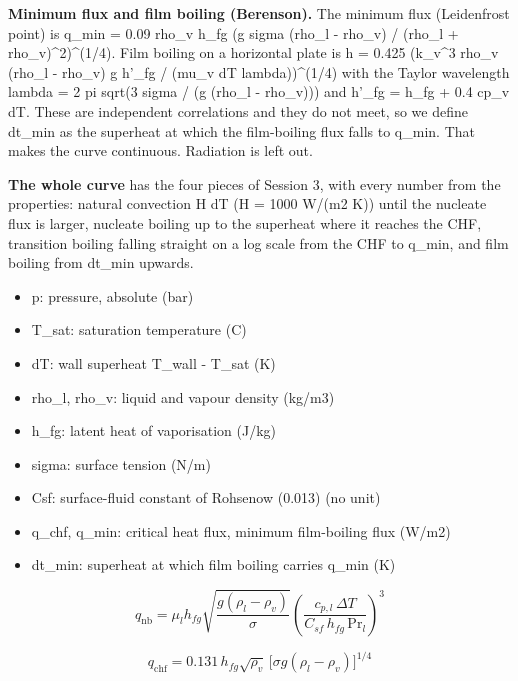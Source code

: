 \documentclass[11pt,a4paper]{article}
\begin{document}
\textbf{Minimum flux and film boiling (Berenson).} The minimum flux (Leidenfrost point) is q\_min = 0.09 rho\_v h\_fg (g sigma (rho\_l - rho\_v) / (rho\_l + rho\_v)\textasciicircum{}2)\textasciicircum{}(1/4). Film boiling on a horizontal plate is h = 0.425 (k\_v\textasciicircum{}3 rho\_v (rho\_l - rho\_v) g h'\_fg / (mu\_v dT lambda))\textasciicircum{}(1/4) with the Taylor wavelength lambda = 2 pi sqrt(3 sigma / (g (rho\_l - rho\_v))) and h'\_fg = h\_fg + 0.4 cp\_v dT. These are independent correlations and they do not meet, so we define dt\_min as the superheat at which the film-boiling flux falls to q\_min. That makes the curve continuous. Radiation is left out.

\textbf{The whole curve} has the four pieces of Session 3, with every number from the properties: natural convection H dT (H = 1000 W/(m2 K)) until the nucleate flux is larger, nucleate boiling up to the superheat where it reaches the CHF, transition boiling falling straight on a log scale from the CHF to q\_min, and film boiling from dt\_min upwards.

\begin{itemize}[nosep]
\item p: pressure, absolute (bar)
\item T\_sat: saturation temperature (C)
\item dT: wall superheat T\_wall - T\_sat (K)
\item rho\_l, rho\_v: liquid and vapour density (kg/m3)
\item h\_fg: latent heat of vaporisation (J/kg)
\item sigma: surface tension (N/m)
\item Csf: surface-fluid constant of Rohsenow (0.013) (no unit)
\item q\_chf, q\_min: critical heat flux, minimum film-boiling flux (W/m2)
\item dt\_min: superheat at which film boiling carries q\_min (K)
\end{itemize}

\begin{equation*}
q_{\mathrm{nb}}=\mu_l h_{fg}\sqrt{\frac{g(\rho_l-\rho_v)}{\sigma}}\left(\frac{c_{p,l}\,\Delta T}{C_{sf}\,h_{fg}\,\mathrm{Pr}_l}\right)^{3}
\end{equation*}

\begin{equation*}
q_{\mathrm{chf}}=0.131\,h_{fg}\sqrt{\rho_v}\,\bigl[\sigma g(\rho_l-\rho_v)\bigr]^{1/4}
\end{equation*}
\end{document}

